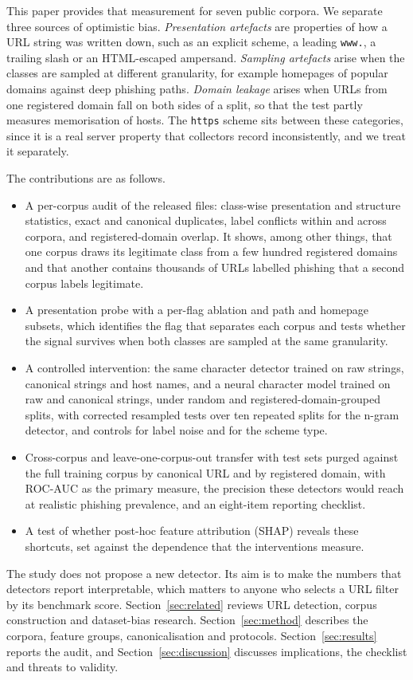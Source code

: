 This paper provides that measurement for seven public corpora. We separate three sources of optimistic bias. \emph{Presentation artefacts} are properties of how a URL string was written down, such as an explicit scheme, a leading \texttt{www.}, a trailing slash or an HTML-escaped ampersand. \emph{Sampling artefacts} arise when the classes are sampled at different granularity, for example homepages of popular domains against deep phishing paths. \emph{Domain leakage} arises when URLs from one registered domain fall on both sides of a split, so that the test partly measures memorisation of hosts. The \texttt{https} scheme sits between these categories, since it is a real server property that collectors record inconsistently, and we treat it separately.

The contributions are as follows.
\begin{itemize}
\item A per-corpus audit of the released files: class-wise presentation and structure statistics, exact and canonical duplicates, label conflicts within and across corpora, and registered-domain overlap. It shows, among other things, that one corpus draws its legitimate class from a few hundred registered domains and that another contains thousands of URLs labelled phishing that a second corpus labels legitimate.
\item A presentation probe with a per-flag ablation and path and homepage subsets, which identifies the flag that separates each corpus and tests whether the signal survives when both classes are sampled at the same granularity.
\item A controlled intervention: the same character detector trained on raw strings, canonical strings and host names, and a neural character model trained on raw and canonical strings, under random and registered-domain-grouped splits, with corrected resampled tests over ten repeated splits for the n-gram detector, and controls for label noise and for the scheme type.
\item Cross-corpus and leave-one-corpus-out transfer with test sets purged against the full training corpus by canonical URL and by registered domain, with ROC-AUC as the primary measure, the precision these detectors would reach at realistic phishing prevalence, and an eight-item reporting checklist.
\item A test of whether post-hoc feature attribution (SHAP) reveals these shortcuts, set against the dependence that the interventions measure.
\end{itemize}

The study does not propose a new detector. Its aim is to make the numbers that detectors report interpretable, which matters to anyone who selects a URL filter by its benchmark score. Section~\ref{sec:related} reviews URL detection, corpus construction and dataset-bias research. Section~\ref{sec:method} describes the corpora, feature groups, canonicalisation and protocols. Section~\ref{sec:results} reports the audit, and Section~\ref{sec:discussion} discusses implications, the checklist and threats to validity.
